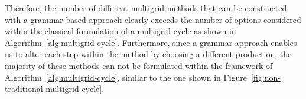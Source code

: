 %	
Therefore, the number of different multigrid methods that can be constructed with a grammar-based approach clearly exceeds the number of options considered within the classical formulation of a multigrid cycle as shown in Algorithm~\ref{alg:multigrid-cycle}.
Furthermore, since a grammar approach enables us to alter each step within the method by choosing a different production, the majority of these methods can not be formulated within the framework of Algorithm~\ref{alg:multigrid-cycle}, similar to the one shown in Figure~\ref{fig:non-traditional-multigrid-cycle}.
\setcounter{equation}{118}


